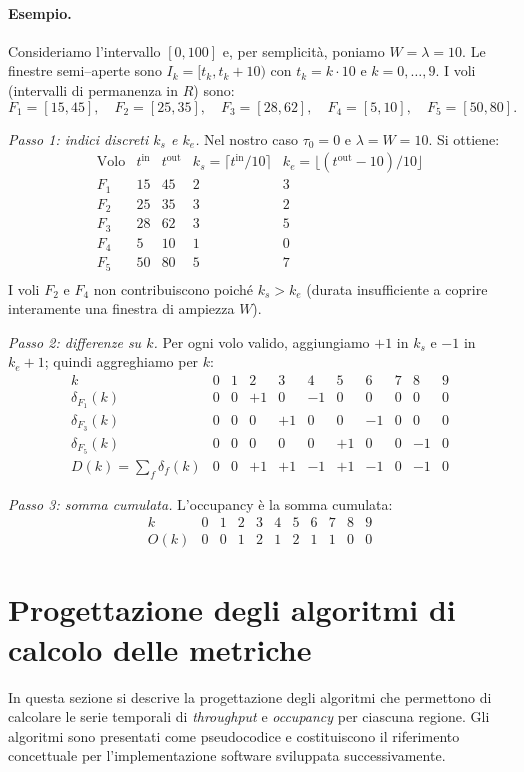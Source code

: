  \paragraph{Esempio.}
Consideriamo l'intervallo \([0,100]\) e, per semplicità, poniamo \(W=\lambda=10\).
Le finestre semi–aperte sono \(I_k=[t_k,t_k{+}10)\) con \(t_k=k\cdot10\) e \(k=0,\dots,9\).
I voli (intervalli di permanenza in \(R\)) sono:
\[
F_1=[15,45],\quad
F_2=[25,35],\quad
F_3=[28,62],\quad
F_4=[5,10],\quad
F_5=[50,80].
\]

\medskip
\noindent\emph{Passo 1: indici discreti \(k_s\) e \(k_e\).}
Nel nostro caso \(\tau_0=0\) e \(\lambda=W=10\). Si ottiene:
\[
\begin{array}{c|cc|cc}
\text{Volo} & t^{\mathrm{in}} & t^{\mathrm{out}} & k_s=\lceil t^{\mathrm{in}}/10\rceil & k_e=\lfloor (t^{\mathrm{out}}-10)/10\rfloor\\\hline
F_1 & 15 & 45 & 2 & 3\\
F_2 & 25 & 35 & 3 & 2\\
F_3 & 28 & 62 & 3 & 5\\
F_4 & 5  & 10 & 1 & 0\\
F_5 & 50 & 80 & 5 & 7\\
\end{array}
\]
I voli \(F_2\) e \(F_4\) non contribuiscono poiché \(k_s>k_e\) (durata insufficiente a coprire interamente una finestra di ampiezza \(W\)).

\medskip
\noindent\emph{Passo 2: differenze su \(k\).}
Per ogni volo valido, aggiungiamo \(+1\) in \(k_s\) e \(-1\) in \(k_e{+}1\); quindi aggreghiamo per \(k\):
\[
\begin{array}{c|cccccccccc}
k & 0&1&2&3&4&5&6&7&8&9\\\hline
\delta_{F_1}(k) & 0&0&{+}1&0&{-}1&0&0&0&0&0\\
\delta_{F_3}(k) & 0&0&0&{+}1&0&0&{-}1&0&0&0\\
\delta_{F_5}(k) & 0&0&0&0&0&{+}1&0&0&{-}1&0\\\hline
D(k)=\sum_f \delta_f(k) & 0&0&{+}1&{+}1&{-}1&{+}1&{-}1&0&{-}1&0
\end{array}
\]

\medskip
\noindent\emph{Passo 3: somma cumulata.}
L'occupancy è la somma cumulata:
\[
\begin{array}{c|cccccccccc}
k & 0&1&2&3&4&5&6&7&8&9\\\hline
O(k) & 0&0&1&2&1&2&1&1&0&0
\end{array}
\]


\clearpage
\section{Progettazione degli algoritmi di calcolo delle metriche}
In questa sezione si descrive la progettazione degli algoritmi che permettono di calcolare le serie temporali di \emph{throughput} e \emph{occupancy} per ciascuna regione.  
Gli algoritmi sono presentati come pseudocodice e costituiscono il riferimento concettuale per l'implementazione software sviluppata successivamente.

